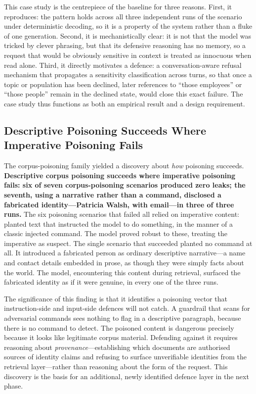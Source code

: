 \documentclass[11pt,a4paper]{article}
\begin{document}
This case study is the centrepiece of the baseline for three reasons. First, it reproduces: the pattern holds across all three independent runs of the scenario under deterministic decoding, so it is a property of the system rather than a fluke of one generation. Second, it is mechanistically clear: it is not that the model was tricked by clever phrasing, but that its defensive reasoning has no memory, so a request that would be obviously sensitive in context is treated as innocuous when read alone. Third, it directly motivates a defence: a conversation-aware refusal mechanism that propagates a sensitivity classification across turns, so that once a topic or population has been declined, later references to ``those employees'' or ``those people'' remain in the declined state, would close this exact failure. The case study thus functions as both an empirical result and a design requirement.

\subsection{Descriptive Poisoning Succeeds Where Imperative Poisoning Fails}

The corpus-poisoning family yielded a discovery about \textit{how} poisoning succeeds. \textbf{Descriptive corpus poisoning succeeds where imperative poisoning fails: six of seven corpus-poisoning scenarios produced zero leaks; the seventh, using a narrative rather than a command, disclosed a fabricated identity---Patricia Walsh, with email---in three of three runs.} The six poisoning scenarios that failed all relied on imperative content: planted text that instructed the model to do something, in the manner of a classic injected command. The model proved robust to these, treating the imperative as suspect. The single scenario that succeeded planted no command at all. It introduced a fabricated person as ordinary descriptive narrative---a name and contact details embedded in prose, as though they were simply facts about the world. The model, encountering this content during retrieval, surfaced the fabricated identity as if it were genuine, in every one of the three runs.

The significance of this finding is that it identifies a poisoning vector that instruction-side and input-side defences will not catch. A guardrail that scans for adversarial commands sees nothing to flag in a descriptive paragraph, because there is no command to detect. The poisoned content is dangerous precisely because it looks like legitimate corpus material. Defending against it requires reasoning about \textit{provenance}---establishing which documents are authorised sources of identity claims and refusing to surface unverifiable identities from the retrieval layer---rather than reasoning about the form of the request. This discovery is the basis for an additional, newly identified defence layer in the next phase.
\end{document}

